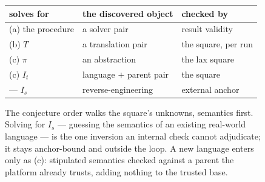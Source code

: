 \begin{figure}
\centering
{}

\medskip
\footnotesize
\setlength{\tabcolsep}{3pt}
\begin{tabular}{@{}lll@{}}
\toprule
solves for & the discovered object & checked by \\
\midrule
(a) the procedure & a solver pair & result validity \\
(b) $T$ & a translation pair & the square, per run \\
(c) $\pi$ & an abstraction & the lax square \\
(c) $I_t$ & language $+$ parent pair & the square \\
--- $I_s$ & reverse-engineering & external anchor \\
\bottomrule
\end{tabular}
\caption{The conjecture order walks the square's unknowns, semantics
first. Solving for $I_s$ --- guessing the semantics of an existing
real-world language --- is the one inversion an internal check
cannot adjudicate; it stays anchor-bound and outside the loop. A new
language enters only as (c): stipulated semantics checked against a
parent the platform already trusts, adding nothing to the trusted
base.}
\label{fig:unknowns}
\end{figure}

